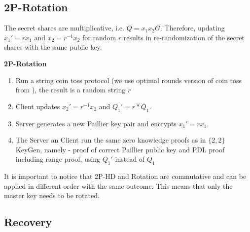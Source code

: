 \documentclass[runningheads]{llncs}
\begin{document}
\subsection{2P-Rotation}
The secret shares are multiplicative, i.e. $Q=x_1x_2G$. Therefore, updating $x_1' = rx_1$ and $x_2 = r^{-1}x_2$ for random $r$ results in re-randomization of the secret shares with the same public key.
\begin{mdframed}[userdefinedwidth = 12.3cm]
\textbf{2P-Rotation}
\begin{enumerate}

\item Run a string coin toss protocol (we use optimal rounds version of coin toss from \cite{simulate}), the result is a random string $r$
\item Client updates $x_2' = r^{-1}x_2$ and $Q_1' = r*Q_1$.
\item Server generates a new Paillier key pair and encrypts $x_1' = rx_1$.
\item The Server an Client run the same zero knowledge proofs as in $\{2,2\}$ KeyGen, namely - proof of correct Paillier public key and PDL proof including range proof, using $Q_1'$ instead of $Q_1$
\end{enumerate}
\end{mdframed}
It is important to notice that 2P-HD and Rotation are commutative and can be applied in different order with the same outcome. This means that only the master key needs to be rotated.
\subsection{Recovery}
\end{document}
